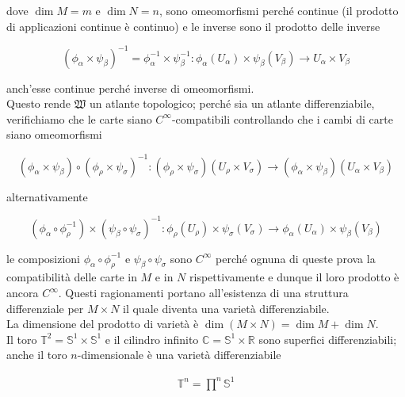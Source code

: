 dove $ \dim M = m $ e $ \dim N = n $, sono omeomorfismi perché continue (il prodotto di applicazioni continue è continuo) e le inverse sono il prodotto delle inverse

\begin{equation}
	(\phi_{\alpha} \times \psi_{\beta})^{-1} = \phi_{\alpha}^{-1} \times \psi_{\beta}^{-1} : \phi_{\alpha}(U_{\alpha}) \times \psi_{\beta}(V_{\beta}) \to U_{\alpha} \times V_{\beta}
\end{equation}

anch'esse continue perché inverse di omeomorfismi.\\
Questo rende $ \mathfrak{W} $ un atlante topologico; perché sia un atlante differenziabile, verifichiamo che le carte siano $ C^{\infty} $-compatibili controllando che i cambi di carte siano omeomorfismi

\begin{equation}
	(\phi_{\alpha} \times \psi_{\beta}) \circ (\phi_{\rho} \times \psi_{\sigma})^{-1} : (\phi_{\rho} \times \psi_{\sigma})(U_{\rho} \times V_{\sigma}) \to (\phi_{\alpha} \times \psi_{\beta})(U_{\alpha} \times V_{\beta})
\end{equation}

alternativamente

\begin{equation}
	(\phi_{\alpha} \circ \phi_{\rho}^{-1}) \times (\psi_{\beta} \circ \psi_{\sigma})^{-1} : \phi_{\rho}(U_{\rho}) \times \psi_{\sigma}(V_{\sigma}) \to \phi_{\alpha}(U_{\alpha}) \times \psi_{\beta}(V_{\beta})
\end{equation}

le composizioni $ \phi_{\alpha} \circ \phi_{\rho}^{-1} $ e $ \psi_{\beta} \circ \psi_{\sigma} $ sono $ C^{\infty} $ perché ognuna di queste prova la compatibilità delle carte in $ M $ e in $ N $ rispettivamente e dunque il loro prodotto è ancora $ C^{\infty} $. Questi ragionamenti portano all'esistenza di una struttura differenziale per $ M \times N $ il quale diventa una varietà differenziabile.\\
La dimensione del prodotto di varietà è $ \dim (M \times N) = \dim M + \dim N $.\\
Il toro $ \mathbb{T}^{2} = \mathbb{S}^{1} \times \mathbb{S}^{1} $ e il cilindro infinito $ \mathbb{C} = \mathbb{S}^{1} \times \mathbb{R} $ sono superfici differenziabili; anche il toro $ n $-dimensionale è una varietà differenziabile

\begin{align}
	\mathbb{T}^{n} = \prod^{n} \mathbb{S}^{1}
\end{align}

